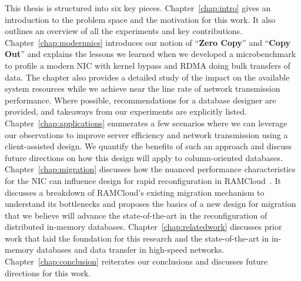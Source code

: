 This thesis is structured into six key pieces. 
Chapter~\ref{chap:intro} gives an introduction to the problem space and the motivation for this work. 
It also outlines an overview of all the experiments and key contributions. Chapter~\ref{chap:modernnics} introduces 
our notion of \enquote{\textbf{Zero Copy}} and \enquote{\textbf{Copy Out}} and explains 
the lessons we learned when we developed a microbenchmark to profile a modern NIC with kernel bypass and RDMA doing bulk transfers 
of data. The chapter also provides a detailed study of the impact on the available system resources while we achieve 
near the line rate of network transmission performance. Where possible, \linebreak recommendations for a database designer are provided, and takeaways 
from our \linebreak experiments are explicitly listed. Chapter~\ref{chap:applications} enumerates a few scenarios where we can 
leverage our observations to improve server efficiency and network transmission using a client-assisted design.
 We quantify the benefits of such an approach and discuss \linebreak future directions on how this design will apply to column-oriented 
 databases. \linebreak Chapter~\ref{chap:migration} discusses how the nuanced performance characteristics for the NIC can \linebreak influence 
design for rapid reconfiguration in RAMCloud~\cite{ramcloud}. It discusses a breakdown of RAMCloud's existing migration mechanism to understand its bottlenecks
and proposes the basics of a new design for migration that we believe will advance the state-of-the-art
in the reconfiguration of distributed in-memory databases. Chapter~\ref{chap:relatedwork} discusses prior work that laid the 
foundation for this research and the state-of-the-art in in-memory databases and data transfer in high-speed networks. 
Chapter~\ref{chap:conclusion} reiterates our conclusions and discusses future directions for this work.

